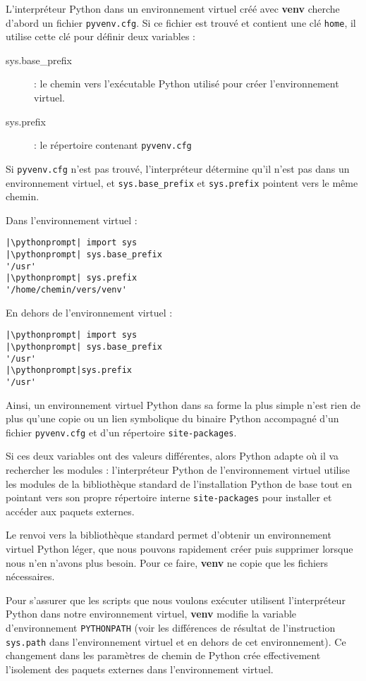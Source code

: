 L'interpréteur Python dans un environnement virtuel créé avec \textbf{venv} cherche d'abord un fichier \texttt{pyvenv.cfg}. Si ce fichier est trouvé et contient une clé \texttt{home}, il utilise cette clé pour définir deux variables :

\begin{description}
    \item[sys.base\_prefix] : le chemin vers l'exécutable Python utilisé pour créer l'environnement virtuel.
    \item[sys.prefix] : le répertoire contenant \texttt{pyvenv.cfg}
\end{description}

Si \texttt{pyvenv.cfg} n'est pas trouvé, l'interpréteur détermine qu'il n'est pas dans un environnement virtuel, et \texttt{sys.base\_prefix} et \texttt{sys.prefix} pointent vers le même chemin.

Dans l'environnement virtuel :
\begin{lstlisting}[style=repl]
|\pythonprompt| import sys
|\pythonprompt| sys.base_prefix
'/usr'
|\pythonprompt| sys.prefix
'/home/chemin/vers/venv'
\end{lstlisting}

En dehors de l'environnement virtuel :
\begin{lstlisting}[style=repl]
|\pythonprompt| import sys
|\pythonprompt| sys.base_prefix
'/usr'
|\pythonprompt|sys.prefix
'/usr'
\end{lstlisting}

Ainsi, un environnement virtuel Python dans sa forme la plus simple n'est rien de plus qu’une copie ou un lien symbolique du binaire Python accompagné d’un fichier \texttt{pyvenv.cfg} et d’un répertoire \texttt{site-packages}. 

Si ces deux variables ont des valeurs différentes, alors Python adapte où il va rechercher les modules : l’interpréteur Python de l'environnement virtuel utilise les modules de la bibliothèque standard de l'installation Python de base tout en pointant vers son propre répertoire interne \texttt{site-packages} pour installer et accéder aux paquets externes.

Le renvoi vers la bibliothèque standard permet d'obtenir un environnement virtuel Python léger, que nous pouvons rapidement créer puis supprimer lorsque nous n’en n'avons plus besoin. Pour ce faire, \textbf{venv} ne copie que les fichiers nécessaires.

Pour s’assurer que les scripts que nous voulons exécuter utilisent l’interpréteur Python dans notre environnement virtuel, \textbf{venv} modifie la variable d’environnement \texttt{PYTHONPATH} (voir les différences de résultat de l'instruction \texttt{sys.path} dans l'environnement virtuel et en dehors de cet environnement). Ce changement dans les paramètres de chemin de Python crée effectivement l’isolement des paquets externes dans l'environnement virtuel.

